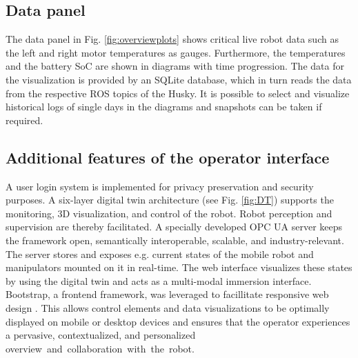 \documentclass[letterpaper, 10 pt, conference]{ieeeconf}  %
\begin{document}
\subsection{Data panel}
The data panel in Fig. \ref{fig:overviewplots} shows critical live robot data such as the left and right motor temperatures as gauges. 
Furthermore, the temperatures and the battery SoC are shown in diagrams with time progression. 
The data for the visualization is provided by an SQLite database, which in turn reads the data from the respective ROS topics of the Husky. 
It is possible to select and visualize historical logs of single days in the diagrams and snapshots can be taken if required.






\subsection{Additional features of the operator interface }
A user login system is implemented for privacy preservation  and security purposes. A six-layer digital twin architecture (see Fig. \ref{fig:DT}) supports the monitoring, 3D visualization, and control of the robot. Robot perception and supervision are thereby facilitated. 
A specially developed OPC UA server  keeps the framework open, semantically interoperable, scalable, and industry-relevant. The server stores and exposes e.g. current states of the mobile robot and manipulators  mounted on it in real-time. 
The web interface visualizes these states by using the digital twin and acts as a multi-modal immersion interface. Bootstrap, a frontend framework, was leveraged to facillitate responsive web design \cite{bootstrap}. 
This allows control elements and data visualizations to be optimally displayed on mobile or desktop devices and ensures that the operator experiences a pervasive, contextualized, and personalized \mbox{overview and collaboration with the robot.}
\end{document}
